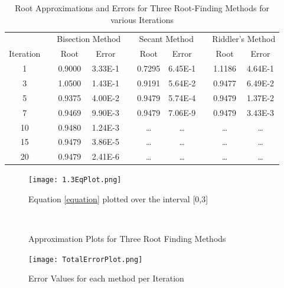 \documentclass[11pt]{article}
\newcommand{\ra}[1]{\renewcommand{\arraystretch}{#1}}
\begin{document}
\begin{table}[]
    \centering\ra{1.2}
    \caption{Root Approximations and Errors for Three Root-Finding Methods for various Iterations}
    \begin{tabular}{@{}cccccccccc@{}}\toprule
    && \multicolumn{2}{c}{Bisection Method} & \phantom{abc} & \multicolumn{2}{c}{Secant Method} &\phantom{abc} & \multicolumn{2}{c}{Riddler's Method} \\
    \cmidrule{3-4} \cmidrule{6-7} \cmidrule{9-10}
    Iteration && Root & Error && Root & Error && Root & Error \\ \midrule
    1 && 0.9000 & 3.33E-1 && 0.7295 & 6.45E-1 && 1.1186 & 4.64E-1\\
    3 && 1.0500 & 1.43E-1 && 0.9191 & 5.64E-2 && 0.9477 & 6.49E-2\\
    5 && 0.9375 & 4.00E-2 && 0.9479 & 5.74E-4 && 0.9479 & 1.37E-2\\
    7 && 0.9469 & 9.90E-3 && 0.9479 & 7.06E-9 && 0.9479 & 3.43E-3\\
    10 && 0.9480 & 1.24E-3 && \dots & \dots && \dots & \dots\\
    15 && 0.9479 & 3.86E-5 && \dots & \dots && \dots & \dots\\
    20 && 0.9479 & 2.41E-6 && \dots & \dots && \dots & \dots\\
    \bottomrule
    \end{tabular}

    \label{tab:Table}
\end{table}

\begin{figure}
    \centering
    \texttt{[image: 1.3EqPlot.png]}
    \caption{Equation \ref{equation} plotted over the interval [0,3]}
    \label{fig:eqplot}
\end{figure}

\begin{figure}
    \centering
     \\
    \caption{Approximation Plots for Three Root Finding Methods}
    \label{VVP}
\end{figure}

\begin{figure}
    \centering
    \texttt{[image: TotalErrorPlot.png]}
    \caption{Error Values for each method per Iteration}
    \label{fig:error}
\end{figure}
\end{document}
